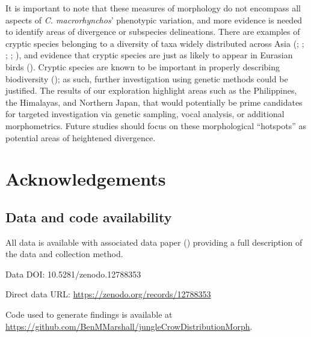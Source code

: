 \documentclass[10pt,a4paper]{article}
\begin{document}
It is important to note that these measures of morphology do not encompass all aspects of \emph{C. macrorhynchos}' phenotypic variation, and more evidence is needed to identify areas of divergence or subspecies delineations.
There are examples of cryptic species belonging to a diversity of taxa widely distributed across Asia (; ; ; ; ), and evidence that cryptic species are just as likely to appear in Eurasian birds ().
Cryptic species are known to be important in properly describing biodiversity (); as such, further investigation using genetic methods could be justified.
The results of our exploration highlight areas such as the Philippines, the Himalayas, and Northern Japan, that would potentially be prime candidates for targeted investigation via genetic sampling, vocal analysis, or additional morphometrics.
Future studies should focus on these morphological ``hotspots'' as potential areas of heightened divergence.

\section{Acknowledgements}\label{acknowledgements}

\subsection{Data and code availability}\label{data-and-code-availability}

All data is available with associated data paper () providing a full description of the data and collection method.

Data DOI: 10.5281/zenodo.12788353

Direct data URL: \url{https://zenodo.org/records/12788353}

Code used to generate findings is available at \url{https://github.com/BenMMarshall/jungleCrowDistributionMorph}.
\end{document}
